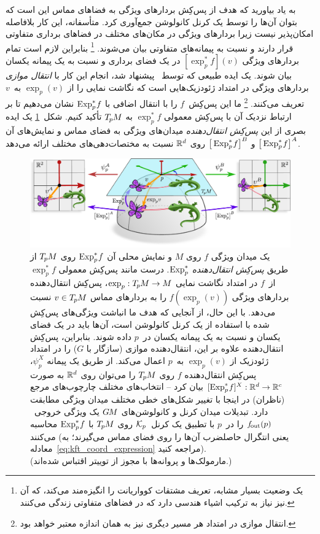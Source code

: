 به یاد بیاورید که هدف از پس‌کِش بردارهای ویژگی به فضاهای مماس این است که بتوان آن‌ها را توسط یک کرنل کانولوشن جمع‌آوری کرد.
متأسفانه، این کار بلافاصله امکان‌پذیر نیست زیرا بردارهای ویژگی در مکان‌های مختلف در فضاهای برداری متفاوتی قرار دارند و نسبت به پیمانه‌های متفاوتی بیان می‌شوند.%
\footnote{
	یک وضعیت بسیار مشابه، تعریف مشتقات کوواریانت را انگیزه‌مند می‌کند، که آن نیز نیاز به ترکیب اشیاء هندسی دارد که در فضاهای متفاوتی زندگی می‌کنند.
}
بنابراین لازم است تمام بردارهای ویژگی $[\exp_p^*f](v)$ در یک فضای برداری و نسبت به یک پیمانه یکسان بیان شوند.
یک ایده طبیعی که توسط~\citet{poulenard2018multi} پیشنهاد شد، انجام این کار با \emph{انتقال موازی} بردارهای ویژگی در امتداد ژئودزیک‌هایی است که نگاشت نمایی را از $\exp_p(v)$ به~$v$ تعریف می‌کنند.%
\footnote{
	انتقال موازی در امتداد هر مسیر دیگری نیز به همان اندازه معتبر خواهد بود.
}
ما این پس‌کِش~$f$ را با انتقال اضافی با $\operatorname{Exp}^*_p\mkern-2mu f$ نشان می‌دهیم تا بر ارتباط نزدیک آن با پس‌کِش معمولی $\exp_p^*f$ به $T_{\mkern-1.5mu p}\mkern-.5muM$ تأکید کنیم.
شکل~\ref{fig:pullback_field_exp_TpM} یک ایده بصری از این \emph{پس‌کِش انتقال‌دهنده} میدان‌های ویژگی به فضای مماس و نمایش‌های آن $\big[\operatorname{Exp}^*_p\mkern-2mu f\big]^A$ و $\big[\operatorname{Exp}^*_p\mkern-2mu f\big]^B$ روی $\mathbb{R}^d$ نسبت به مختصات‌دهی‌های مختلف ارائه می‌دهد.

\begin{figure}[H]
	\centering
	\includegraphics[width=\textwidth]{figures/pullback_field_exp_TpM.pdf}
	\caption{\small
		یک میدان ویژگی $f$ روی $M$ و نمایش محلی آن $\operatorname{Exp}^*_p\mkern-2mu f$ روی $T_{\mkern-1.5mu p}\mkern-.5muM$ از طریق \emph{پس‌کِش انتقال‌دهنده} $\operatorname{Exp}^*_p$.
		درست مانند پس‌کِش معمولی $\exp_p^*f$ از~$f$ در امتداد نگاشت نمایی $\exp_p: T_{\mkern-1.5mu p}\mkern-.5muM \to M$، پس‌کِش انتقال‌دهنده بردارهای ویژگی $f(\exp_p(v))$ را به بردارهای مماس $v\in T_{\mkern-1.5mu p}\mkern-.5muM$ نسبت می‌دهد.
		با این حال، از آنجایی که هدف ما انباشت ویژگی‌های پس‌کِش شده با استفاده از یک کرنل کانولوشن است، آن‌ها باید در یک فضای یکسان و نسبت به یک پیمانه یکسان در~$p$ داده شوند.
		بنابراین، پس‌کِش انتقال‌دهنده علاوه بر این، انتقال‌دهنده موازی (سازگار با $G$) را در امتداد ژئودزیک از $\exp_p(v)$ به~$p$ اعمال می‌کند.
		از طریق یک پیمانه $\psi_p^X$، پس‌کِش انتقال‌دهنده $f$ روی $T_{\mkern-1.5mu p}\mkern-.5muM$ را می‌توان روی $\mathbb{R}^d$ به صورت $[\operatorname{Exp}^*_p\mkern-2mu f]^X: \mathbb{R}^d \to \mathbb{R}^c$ بیان کرد -- انتخاب‌های مختلف چارچوب‌های مرجع (ناظران) در اینجا با تغییر شکل‌های خطی مختلف میدان ویژگی مطابقت دارد.
		تبدیلات میدان کرنل و کانولوشن‌های $G\mkern-1.4muM$ یک ویژگی خروجی~$f_\textup{\:\!\!out}(p)$ را در~$p$ با تطبیق یک کرنل~$\mathcal{K}_p$ روی $T_{\mkern-1.5mu p}\mkern-.5muM$ با $\operatorname{Exp}^*_p\mkern-2mu f$ محاسبه می‌کنند (یعنی انتگرال حاصلضرب آن‌ها را روی فضای مماس می‌گیرند؛ به معادله~\eqref{eq:kft_coord_expression} مراجعه کنید).
		{ \\
			\color{gray}
			\scriptsize
			(مارمولک‌ها و پروانه‌ها با مجوز \href{https://github.com/twitter/twemoji/blob/gh-pages/LICENSE-GRAPHICS}{} از توییتر اقتباس شده‌اند.)
		}
	}
	\label{fig:pullback_field_exp_TpM}
\end{figure}

